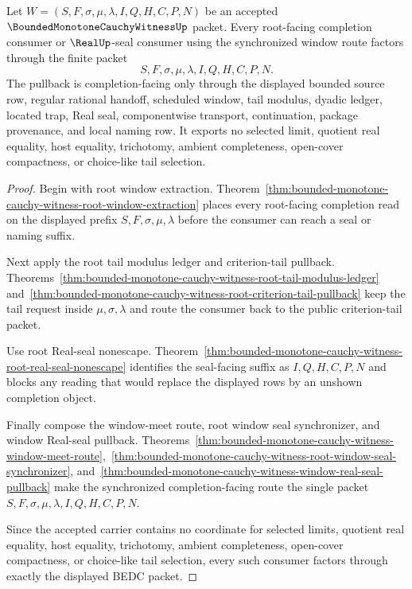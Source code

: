 \begin{theorem}
\label{thm:bounded-monotone-cauchy-witness-window-completion-pullback}
Let $W=(S,F,\sigma,\mu,\lambda,I,Q,H,C,P,N)$ be an accepted $\BoundedMonotoneCauchyWitnessUp$ packet. Every root-facing completion consumer or $\RealUp$-seal consumer using the synchronized window route factors through the finite packet
$$
S,F,\sigma,\mu,\lambda,I,Q,H,C,P,N.
$$
The pullback is completion-facing only through the displayed bounded source row, regular rational handoff, scheduled window, tail modulus, dyadic ledger, located trap, Real seal, componentwise transport, continuation, package provenance, and local naming row. It exports no selected limit, quotient real equality, host equality, trichotomy, ambient completeness, open-cover compactness, or choice-like tail selection.
\end{theorem}
\begin{proof}
Begin with root window extraction. Theorem~\ref{thm:bounded-monotone-cauchy-witness-root-window-extraction} places every root-facing completion read on the displayed prefix $S,F,\sigma,\mu,\lambda$ before the consumer can reach a seal or naming suffix.

Next apply the root tail modulus ledger and criterion-tail pullback. Theorems~\ref{thm:bounded-monotone-cauchy-witness-root-tail-modulus-ledger} and~\ref{thm:bounded-monotone-cauchy-witness-root-criterion-tail-pullback} keep the tail request inside $\mu,\sigma,\lambda$ and route the consumer back to the public criterion-tail packet.

Use root Real-seal nonescape. Theorem~\ref{thm:bounded-monotone-cauchy-witness-root-real-seal-nonescape} identifies the seal-facing suffix as $I,Q,H,C,P,N$ and blocks any reading that would replace the displayed rows by an unshown completion object.

Finally compose the window-meet route, root window seal synchronizer, and window Real-seal pullback. Theorems~\ref{thm:bounded-monotone-cauchy-witness-window-meet-route},~\ref{thm:bounded-monotone-cauchy-witness-root-window-seal-synchronizer}, and~\ref{thm:bounded-monotone-cauchy-witness-window-real-seal-pullback} make the synchronized completion-facing route the single packet $S,F,\sigma,\mu,\lambda,I,Q,H,C,P,N$.

Since the accepted carrier contains no coordinate for selected limits, quotient real equality, host equality, trichotomy, ambient completeness, open-cover compactness, or choice-like tail selection, every such consumer factors through exactly the displayed BEDC packet.
\end{proof}

